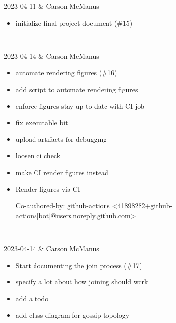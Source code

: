 2023-04-11 & Carson McManus
\begin{itemize}[topsep=0pt,itemsep=0pt,parsep=0pt,partopsep=0pt,leftmargin=12pt]
\item initialize final project document (\#15)


\end{itemize}
\\ \hline

2023-04-14 & Carson McManus
\begin{itemize}[topsep=0pt,itemsep=0pt,parsep=0pt,partopsep=0pt,leftmargin=12pt]
\item automate rendering figures (\#16)

\item add script to automate rendering figures

\item enforce figures stay up to date with CI job

\item fix executable bit

\item upload artifacts for debugging

\item loosen ci check

\item make CI render figures instead

\item Render figures via CI



Co-authored-by: github-actions <41898282+github-actions[bot]@users.noreply.github.com>
\end{itemize}
\\ \hline

2023-04-14 & Carson McManus
\begin{itemize}[topsep=0pt,itemsep=0pt,parsep=0pt,partopsep=0pt,leftmargin=12pt]
\item Start documenting the join process (\#17)

\item specify a lot about how joining should work

\item add a todo

\item add class diagram for gossip topology
\end{itemize}
\\ \hline

